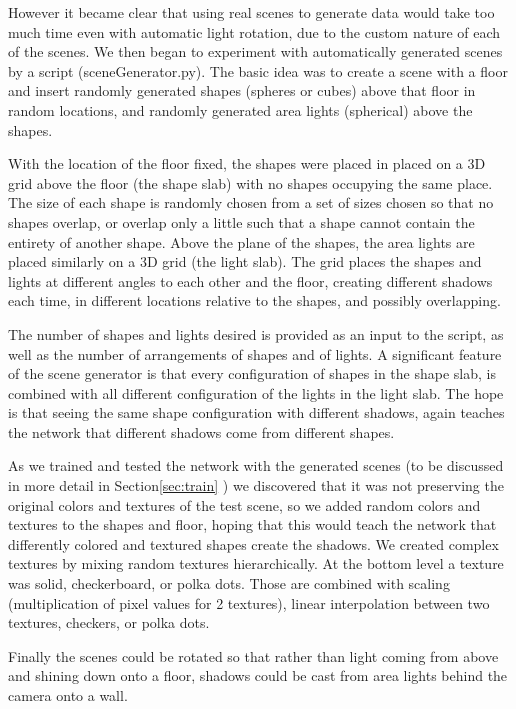 \documentclass[acmsmall]{acmart}
\begin{document}
However it became clear that using real scenes to generate data would take too much time even with automatic light rotation, due to the custom nature of each of the scenes. We then began to experiment with automatically generated scenes by a script (sceneGenerator.py). The basic idea was to create a scene with a floor and insert randomly generated shapes (spheres or cubes) above that floor in random locations, and randomly generated area lights (spherical) above the shapes.

With the location of the floor fixed, the shapes were placed in placed on a 3D grid above the floor (the shape slab) with no shapes occupying the same place. The size of each shape is randomly chosen from a set of sizes chosen so that no shapes overlap, or overlap only a little such that a shape cannot contain the entirety of another shape. Above the plane of the shapes, the area lights are placed similarly on a 3D grid (the light slab). The grid places the shapes and lights at different angles to each other and the floor, creating different shadows each time, in different locations relative to the shapes, and possibly overlapping.

The number of shapes and lights desired is provided as an input to the script, as well as the number of arrangements of shapes and of lights. A significant feature of the scene generator is that every configuration of shapes in the shape slab, is combined with all different configuration of the lights in the light slab. The hope is that seeing the same shape configuration with different shadows, again teaches the network that different shadows come from different shapes.

As we trained and tested the network with the generated scenes (to be discussed in more detail in Section\ref{sec:train} ) we discovered that it was not preserving the original colors and textures of the test scene, so we added random colors and textures to the shapes and floor, hoping that this would teach the network that differently colored and textured shapes create the shadows. We created complex textures by mixing random textures hierarchically. At the bottom level a texture was solid, checkerboard, or polka dots. Those are combined with scaling (multiplication of pixel values for 2 textures), linear interpolation between two textures, checkers, or polka dots.

Finally the scenes could be rotated so that rather than light coming from above and shining down onto a floor, shadows could be cast from area lights behind the camera onto a wall. 
\end{document}
